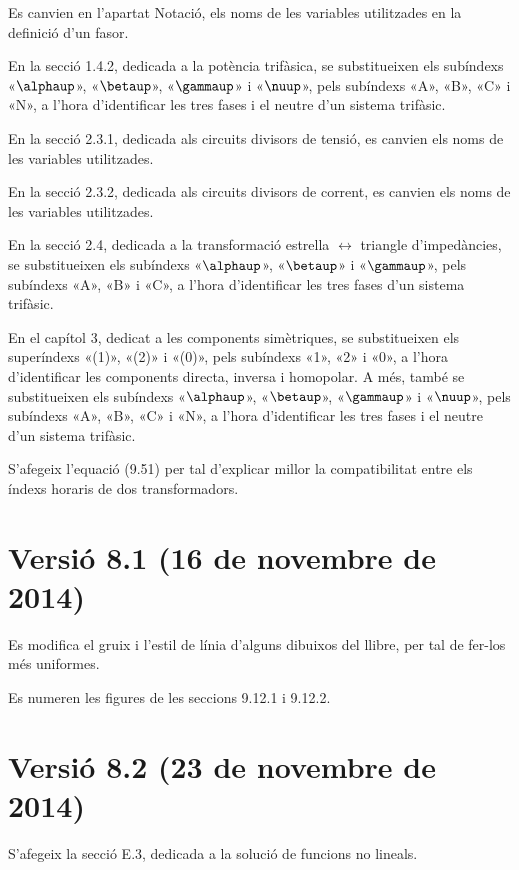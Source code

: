 Es canvien en l'apartat Notació, els noms de les variables utilitzades en la definició d'un fasor.

En la secció 1.4.2, dedicada a la potència trifàsica, se substitueixen els subíndexs «$\alphaup$», «$\betaup$», «$\gammaup$» i «$\nuup$», pels subíndexs «A», «B», «C» i «N», a l'hora d'identificar les tres fases  i el neutre d'un sistema trifàsic.

En la secció 2.3.1,  dedicada als circuits divisors de tensió, es canvien els noms de les variables utilitzades.

En la secció 2.3.2,  dedicada als circuits divisors de corrent, es canvien els noms de les variables utilitzades.

En la secció 2.4, dedicada a la transformació estrella $\boldsymbol{\leftrightarrow}$ triangle d'impedàncies, se substitueixen els subíndexs «$\alphaup$», «$\betaup$» i «$\gammaup$», pels subíndexs «A», «B» i «C», a l'hora d'identificar les tres fases d'un sistema trifàsic.

En el capítol 3, dedicat a les components simètriques, se substitueixen els superíndexs «(1)», «(2)» i «(0)», pels subíndexs «1», «2» i «0», a l'hora d'identificar les components directa, inversa i homopolar. A més, també se substitueixen els subíndexs «$\alphaup$», «$\betaup$», «$\gammaup$» i «$\nuup$», pels subíndexs «A», «B»,  «C» i «N», a l'hora d'identificar les tres fases i el neutre d'un sistema trifàsic.

S'afegeix l'equació (9.51) per tal d'explicar millor la compatibilitat entre els índexs horaris de dos transformadors.

\section*{Versió 8.1 (16 de novembre de 2014)}

Es modifica el gruix i l'estil de línia d'alguns dibuixos del llibre, per tal de fer-los més uniformes.

Es numeren les figures de les seccions 9.12.1 i 9.12.2.


\section*{Versió 8.2 (23 de novembre de 2014)}

S'afegeix la secció E.3, dedicada a la solució de funcions no lineals.

